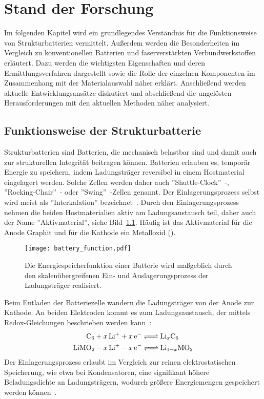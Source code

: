 \chapter{Stand der Forschung}

Im folgenden Kapitel wird ein grundlegendes Verständnis für die Funktionsweise von Strukturbatterien vermittelt. Außerdem werden die Besonderheiten im Vergleich zu konventionellen Batterien und faserverstärkten Verbundwerkstoffen erläutert. Dazu werden die wichtigsten Eigenschaften und deren Ermittlungsverfahren dargestellt sowie die Rolle der einzelnen Komponenten im Zusammenhang mit der Materialauswahl näher erklärt. Anschließend werden aktuelle Entwicklungsansätze diskutiert und abschließend die ungelösten Herausforderungen mit den aktuellen Methoden näher analysiert.

\section{Funktionsweise der Strukturbatterie} Strukturbatterien sind Batterien, die mechanisch belastbar sind und damit auch zur strukturellen Integrität beitragen können.
Batterien erlauben es, temporär Energie zu speichern, indem Ladungsträger reversibel in einem Hostmaterial eingelagert werden. Solche Zellen werden daher auch ''Shuttle-Clock''~\cite{Ohzuku1993}-, ''Rocking-Chair''~\cite{Tarascon1993}- oder ''Swing''~\cite{Bittihn1993}-Zellen genannt. Der Einlagerungsprozess selbst wird meist als ''Interkalation'' bezeichnet~\cite{Eichinger1976}. Durch den Einlagerungsprozess nehmen die beiden Hostmaterialien aktiv am Ladungsaustausch teil, daher auch der Name ''Aktivmaterial'', siehe Bild~\ref{fig:battery_function}. Häufig ist das Aktivmaterial für die Anode Graphit und für die Kathode ein Metalloxid ().
\begin{figure}[ht]
        \center
	\texttt{[image: battery\_function.pdf]}
		\caption{\label{fig:battery_function}Die Energiespeicherfunktion einer Batterie wird maßgeblich durch den skalenübergreifenen Ein- und Auslagerungsprozess der Ladungsträger realisiert.}
\end{figure}
Beim Entladen der Batteriezelle wandern die Ladungsträger von der Anode zur Kathode. An beiden Elektroden kommt es zum Ladungsaustausch, der mittels Redox-Gleichungen beschrieben werden kann~\cite{Goodenough2013}: 
\begin{align}
	\ce{C_6 + x Li^+ + x e^- &<=> Li_xC_6}\\ 
	\ce{LiMO_2 - x Li^+ - x e^- &<=> Li_{1-x}MO_2} 
\end{align} 
Der Einlagerungsprozess erlaubt im Vergleich zur reinen elektrostatischen Speicherung, wie etwa bei Kondensatoren, eine signifikant höhere Beladungsdichte an Ladungsträgern, wodurch größere Energiemengen gespeichert werden können~\cite{Newman2021}.


